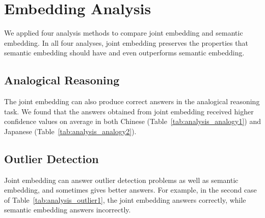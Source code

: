 \section{Embedding Analysis} \label{sec:analysis}

We applied four analysis methods to compare joint embedding and semantic embedding. In all four analyses, joint embedding preserves the properties that semantic embedding should have and even outperforms semantic embedding.

\subsection{Analogical Reasoning} \label{sec:analysis_analogy}

The joint embedding can also produce correct answers in the analogical reasoning task.  We found that the answers obtained from joint embedding received higher confidence values on average in both Chinese (Table~\ref{tab:analysis_analogy1}) and Japanese (Table~\ref{tab:analysis_analogy2}). 

\subsection{Outlier Detection} \label{sec:analysis_outlier}

\begin{CJK}{UTF8}{gbsn}    
    Joint embedding can answer outlier detection problems as well as semantic embedding, and sometimes gives better answers. For example, in the second case of Table~\ref{tab:analysis_outlier1}, the joint embedding answers correctly, while semantic embedding answers incorrectly.
\end{CJK}

